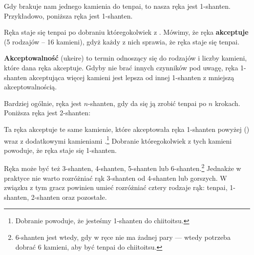 \bigskip

Gdy brakuje nam jednego kamienia do {\jap tenpai}, to nasza ręka jest 1-{\jap shanten}.
Przykładowo, poniższa ręka jest 1-{\jap shanten}.
\bigskip
\begin{screen}
\end{screen}
Ręka staje się {\jap tenpai} po dobraniu któregokolwiek z .
Mówimy, że ręka {\bf akceptuje}  (5 rodzajów -- 16 kamieni), gdyż każdy z nich sprawia, że ręka staje się {\jap tenpai}.

{\bf Akceptowalność} ({\jap ukeire}) to termin odnoszący się do rodzajów i liczby kamieni, które dana ręka akceptuje.
Gdyby nie brać innych czynników pod uwagę, ręka 1-{\jap shanten} akceptująca więcej kamieni jest lepsza od innej 1-{\jap shanten} z mniejszą akceptowalnością.

\bigskip
Bardziej ogólnie, ręka jest $n$-{\jap shanten}, gdy da się ją zrobić {\jap tenpai} po $n$ krokach.
Poniższa ręka jest 2-{\jap shanten}:
\bigskip
\begin{screen}
\end{screen}
\vspace{5pt}
\noindent
Ta ręka akceptuje te same kamienie, które akceptowała ręka 1-{\jap shanten} powyżej () wraz z dodatkowymi kamieniami .\footnote{Dobranie  powoduje, że jesteśmy 1-{\jap shanten} do {\jap chiitoitsu}.}
Dobranie któregokolwiek z tych kamieni powoduje, że ręka staje się 1-{\jap shanten}.

\bigskip
Ręka może być też 3-{\jap shanten}, 4-{\jap shanten}, 5-{\jap shanten} lub 6-{\jap shanten}.\footnote{6-{\jap shanten} jest wtedy, gdy w ręce nie ma żadnej pary --- wtedy potrzeba dobrać 6 kamieni, aby być {\jap tenpai} do {\jap chiitoitsu}.}
Jednakże w praktyce nie warto rozróżniać rąk 3-{\jap shanten} od 4-{\jap shanten} lub gorszych.
W związku z tym gracz powinien umieć rozróżniać cztery rodzaje rąk: {\jap tenpai}, 1-{\jap shanten}, 2-{\jap shanten} oraz pozostałe.

